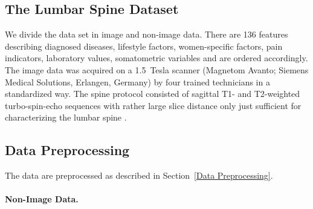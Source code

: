 \documentclass[journal]{style/vgtc} 			          %
\begin{document}
\subsection{The Lumbar Spine Dataset}
We divide the data set in image and non-image data.
%
There are 136 features describing diagnosed diseases, lifestyle factors, women-specific factors, pain indicators, laboratory values, somatometric variables and are ordered accordingly.
%
The image data was acquired on a 1.5~Tesla scanner (Magnetom Avanto; Siemens Medical Solutions, Erlangen, Germany) by four trained technicians in a standardized way.
%
The spine protocol consisted of sagittal T1- and T2-weighted turbo-spin-echo sequences with rather large slice distance only just sufficient for characterizing the lumbar spine \cite{Hegenscheid2013}.

\subsection{Data Preprocessing} \label{application:Data Preprocessing}
The data are preprocessed as described in Section~\ref{Data Preprocessing}.
%
\paragraph{Non-Image Data.} 
\end{document}
